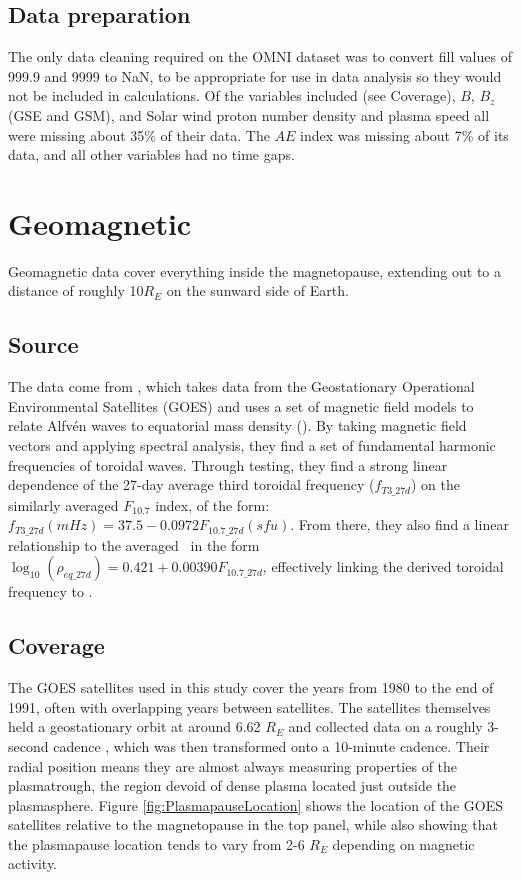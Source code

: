 \subsection{Data preparation}
The only data cleaning required on the OMNI dataset was to convert fill values of 999.9 and 9999 to NaN, to be appropriate for use in data analysis so they would not be included in calculations. Of the variables included (see Coverage), $B$, $B_z$ (GSE and GSM), and Solar wind proton number density and plasma speed all were missing about 35\% of their data. The $AE$ index was missing about 7\% of its data, and all other variables had no time gaps.

\section{Geomagnetic}
Geomagnetic data cover everything inside the magnetopause, extending out to a distance of roughly 10$R_E$ on the sunward side of Earth. 

\subsection{Source}
The data come from \cite{Takahashi2010SolarCycleVariation}, which takes data from the Geostationary Operational Environmental Satellites (GOES) and uses a set of magnetic field models to relate Alfvén waves to equatorial mass density (\req). By taking magnetic field vectors and applying spectral analysis, they find a set of fundamental harmonic frequencies of toroidal waves. Through testing, they find a strong linear dependence of the 27-day average third toroidal frequency ($f_{T3\_27d}$) on the similarly averaged $F_{10.7}$ index, of the form: $f_{T3\_27d}(mHz)=37.5-0.0972 F_{10.7\_27d}(sfu)$. From there, they also find a linear relationship to the averaged \req\ in the form $\log_{10}(\rho_{eq\_27d})=0.421+0.00390 F_{10.7\_27d}$, effectively linking the derived toroidal frequency to \req.

\subsection{Coverage}
\label{DataSparsity}
The GOES satellites used in this study cover the years from 1980 to the end of 1991, often with overlapping years between satellites. The satellites themselves held a geostationary orbit at around 6.62 $R_E$ and collected data on a roughly 3-second cadence \citep{GOESDataSource}, which was then transformed onto a 10-minute cadence. Their radial position means they are almost always measuring properties of the plasmatrough, the region devoid of dense plasma located just outside the plasmasphere. Figure \ref{fig:PlasmapauseLocation} shows the location of the GOES satellites relative to the magnetopause in the top panel, while also showing that the plasmapause location tends to vary from 2-6 $R_E$ depending on magnetic activity.


